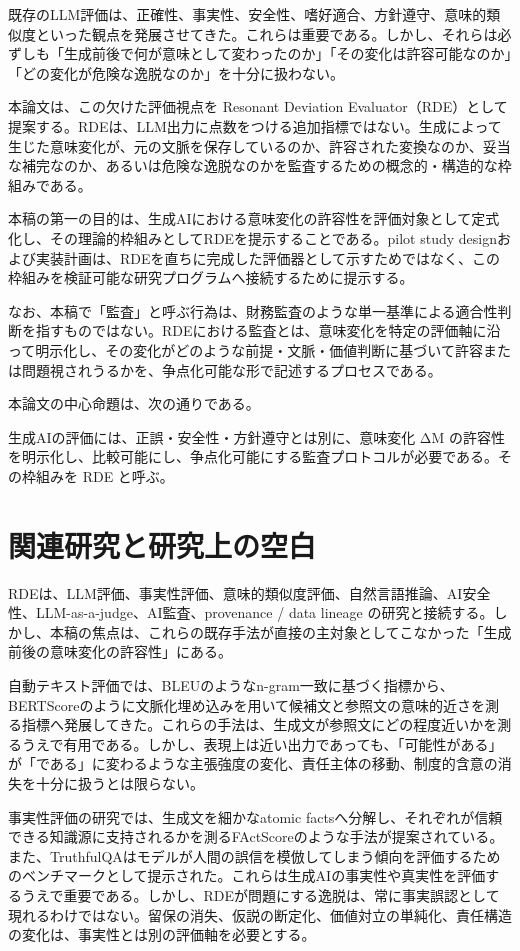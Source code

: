 \documentclass[
  a4paper]{ltjsarticle}
\begin{document}
既存のLLM評価は、正確性、事実性、安全性、嗜好適合、方針遵守、意味的類似度といった観点を発展させてきた。これらは重要である。しかし、それらは必ずしも「生成前後で何が意味として変わったのか」「その変化は許容可能なのか」「どの変化が危険な逸脱なのか」を十分に扱わない。

本論文は、この欠けた評価視点を Resonant Deviation
Evaluator（RDE）として提案する。RDEは、LLM出力に点数をつける追加指標ではない。生成によって生じた意味変化が、元の文脈を保存しているのか、許容された変換なのか、妥当な補完なのか、あるいは危険な逸脱なのかを監査するための概念的・構造的な枠組みである。

本稿の第一の目的は、生成AIにおける意味変化の許容性を評価対象として定式化し、その理論的枠組みとしてRDEを提示することである。pilot
study
designおよび実装計画は、RDEを直ちに完成した評価器として示すためではなく、この枠組みを検証可能な研究プログラムへ接続するために提示する。

なお、本稿で「監査」と呼ぶ行為は、財務監査のような単一基準による適合性判断を指すものではない。RDEにおける監査とは、意味変化を特定の評価軸に沿って明示化し、その変化がどのような前提・文脈・価値判断に基づいて許容または問題視されうるかを、争点化可能な形で記述するプロセスである。

本論文の中心命題は、次の通りである。

生成AIの評価には、正誤・安全性・方針遵守とは別に、意味変化 ΔM
の許容性を明示化し、比較可能にし、争点化可能にする監査プロトコルが必要である。その枠組みを
RDE と呼ぶ。

\section{関連研究と研究上の空白}\label{related-work-and-research-gap}

RDEは、LLM評価、事実性評価、意味的類似度評価、自然言語推論、AI安全性、LLM-as-a-judge、AI監査、provenance
/ data lineage
の研究と接続する。しかし、本稿の焦点は、これらの既存手法が直接の主対象としてこなかった「生成前後の意味変化の許容性」にある。

自動テキスト評価では、BLEUのようなn-gram一致に基づく指標から、BERTScoreのように文脈化埋め込みを用いて候補文と参照文の意味的近さを測る指標へ発展してきた\cite{papineni2002,zhang2020}。これらの手法は、生成文が参照文にどの程度近いかを測るうえで有用である。しかし、表現上は近い出力であっても、「可能性がある」が「である」に変わるような主張強度の変化、責任主体の移動、制度的含意の消失を十分に扱うとは限らない。

事実性評価の研究では、生成文を細かなatomic
factsへ分解し、それぞれが信頼できる知識源に支持されるかを測るFActScoreのような手法が提案されている\cite{min2023}。また、TruthfulQAはモデルが人間の誤信を模倣してしまう傾向を評価するためのベンチマークとして提示された\cite{lin2022}。これらは生成AIの事実性や真実性を評価するうえで重要である。しかし、RDEが問題にする逸脱は、常に事実誤認として現れるわけではない。留保の消失、仮説の断定化、価値対立の単純化、責任構造の変化は、事実性とは別の評価軸を必要とする。
\end{document}
